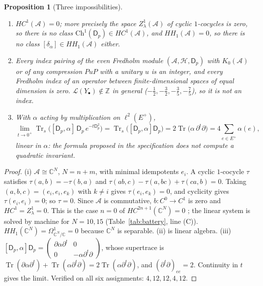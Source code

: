 \documentclass[11pt]{amsart}
\numberwithin{equation}{section}
\newtheorem{proposition}[theorem]{Proposition}
\theoremstyle{definition}
\theoremstyle{remark}
\newcommand{\Z}{\mathbb{Z}}
\newcommand{\C}{\mathbb{C}}
\newcommand{\cA}{\mathcal{A}}
\newcommand{\cH}{\mathcal{H}}
\newcommand{\cL}{\mathcal{L}}
\newcommand{\Dp}{\mathsf{D}_p}
\newcommand{\Tr}{\operatorname{Tr}}
\newcommand{\Trs}{\operatorname{Tr}_s}
\newcommand{\HC}{\mathit{HC}}
\newcommand{\HH}{\mathit{HH}}
\begin{document}
\begin{proposition}[Three impossibilities]\label{prop:nogo}
\begin{enumerate}
\item[(i)] $\HC^{1}(\cA)=0$; more precisely the space $Z^{1}_\lambda(\cA)$ of cyclic
$1$-cocycles is zero, so there is no class $\mathrm{Ch}^{1}(\Dp)\in\HC^{1}(\cA)$, and
$\HH_1(\cA)=0$, so there is no class $[\delta_\alpha]\in\HH_1(\cA)$ either.
\item[(ii)] Every index pairing of the even Fredholm module $(\cA,\cH,\Dp)$ with $K_0(\cA)$
or of any compression $PuP$ with a unitary $u$ is an integer, and every Fredholm index of an
operator between finite-dimensional spaces of equal dimension is zero. $\cL(Y_\bullet)\notin\Z$
in general ($-\frac12,-\frac32,-\frac35,-\frac75$), so it is not an index.
\item[(iii)] With $\alpha$ acting by multiplication on $\ell^{2}(E^{+})$,
\[
\lim_{t\to0^{+}}\Trs\bigl([\Dp,\alpha]\,\Dp\,e^{-t\Dp^{2}}\bigr)=\Trs\bigl([\Dp,\alpha]\Dp\bigr)
=2\Tr\bigl(\alpha\,\partial^{t}\partial\bigr)=4\sum_{e\in E^{+}}\alpha(e),
\]
linear in $\alpha$: the formula proposed in the specification does not compute a quadratic
invariant.
\end{enumerate}
\end{proposition}

\begin{proof}
(i) $\cA\cong\C^{N}$, $N=n+m$, with minimal idempotents $e_i$. A cyclic $1$-cocycle
$\tau$ satisfies $\tau(a,b)=-\tau(b,a)$ and $\tau(ab,c)-\tau(a,bc)+\tau(ca,b)=0$. Taking
$(a,b,c)=(e_i,e_i,e_k)$ with $k\ne i$ gives $\tau(e_i,e_k)=0$, and cyclicity gives
$\tau(e_i,e_i)=0$; so $\tau=0$. Since $\cA$ is commutative, $b\colon C^{0}\to C^{1}$ is zero
and $\HC^{1}=Z^{1}_\lambda=0$. This is the case $n=0$ of $\HC^{2n+1}(\C^{N})=0$
\cite[2.1.12]{Lo}; the linear system is solved by machine for $N=10,15$
(Table~\ref{tab:battery}, line (C)). $\HH_1(\C^{N})=\Omega^{1}_{\C^{N}/\C}=0$ because
$\C^{N}$ is separable. (ii) is linear algebra. (iii) $[\Dp,\alpha]\Dp=
\begin{pmatrix}\partial\alpha\partial^{t}&0\\0&-\alpha\partial^{t}\partial\end{pmatrix}$,
whose supertrace is $\Tr(\partial\alpha\partial^{t})+\Tr(\alpha\partial^{t}\partial)
=2\Tr(\alpha\partial^{t}\partial)$, and $(\partial^{t}\partial)_{ee}=2$. Continuity in $t$
gives the limit. Verified on all six assignments: $4,12,12,4,12$.
\end{proof}
\end{document}
